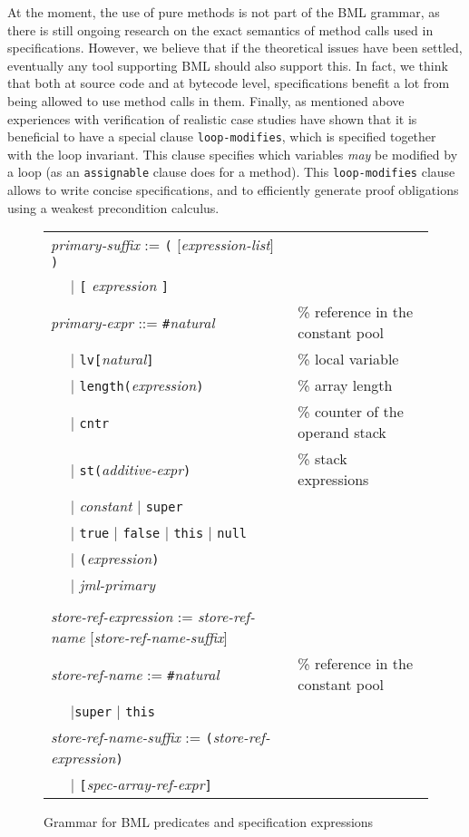 At the moment, the use of pure methods is not part of the BML grammar,
as there is still ongoing research on the exact semantics of method
calls used in specifications. However, we believe that if the
theoretical issues have been settled, eventually any tool supporting
BML should also support this. In fact, we think that both at source
code and at bytecode level, specifications benefit a lot from being
allowed to use method calls in them. Finally, as mentioned above
experiences with verification of realistic case studies have shown
that it is beneficial to have a special clause
\texttt{loop-modifies}, which is specified together with the loop
invariant. This clause specifies which variables
\emph{may} be modified by a loop (as an \texttt{assignable} clause does
for a method). This \texttt{loop-modifies} clause allows to write
concise specifications, and to efficiently generate proof obligations
using a weakest precondition calculus.

\begin{figure}[t]

\begin{tabular}{lll}
\multicolumn{2}{l}{\emph{primary-suffix} := \texttt{(} [\emph{expression-list}] \texttt{)}}\\
\hspace*{1cm}& \(\mid\) \texttt{[} \emph{expression} \texttt{]}\\
\multicolumn{2}{l}{\emph{primary-expr} ::= 
\texttt{\#}\emph{natural}} & \% reference in the constant pool \\
&\(\mid\) \texttt{lv[}\emph{natural}\texttt{]} &\% local variable \\
&\(\mid\) \texttt{length(}\emph{expression}\texttt{)} &\% array
length \\
&\(\mid\) \texttt{cntr} &\% counter of the operand stack\\
&\(\mid\) \texttt{st(}\emph{additive-expr}\texttt{)} &\% stack
expressions\\
&\(\mid\) \emph{constant} \(\mid\)
\texttt{super}\\
&\(\mid\) \texttt{true} \(\mid\) \texttt{false} \(\mid\)
\texttt{this} \(\mid\) \texttt{null} \\
&\(\mid\) \texttt{(}\emph{expression}\texttt{)}\\
&\(\mid\) \emph{jml-primary}\\
\\
\multicolumn{2}{l}{\emph{store-ref-expression} := \emph{store-ref-name}
[\emph{store-ref-name-suffix}]}\\
\multicolumn{2}{l}{\emph{store-ref-name} := 
\texttt{\#}\emph{natural}} &\% reference in the constant pool \\
&\(\mid\)\texttt{super} \(\mid\) \texttt{this}\\
\multicolumn{2}{l}{\emph{store-ref-name-suffix} := 
\texttt{(}\emph{store-ref-expression}\texttt{)}}\\
&\(\mid\) \texttt{[}\emph{spec-array-ref-expr}\texttt{]}
\end{tabular}

\caption{Grammar for BML predicates and specification expressions}
\label{FigBMLGrammar}
\end{figure}

